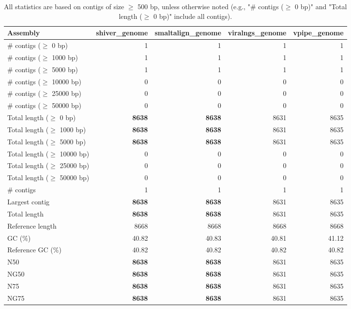 \documentclass[12pt,a4paper]{article}
\begin{document}
\begin{table}[ht]
\begin{center}
\caption{All statistics are based on contigs of size $\geq$ 500 bp, unless otherwise noted (e.g., "\# contigs ($\geq$ 0 bp)" and "Total length ($\geq$ 0 bp)" include all contigs).}
\begin{tabular}{|l*{4}{|r}|}
\hline
Assembly & shiver\_genome & smaltalign\_genome & viralngs\_genome & vpipe\_genome \\ \hline
\# contigs ($\geq$ 0 bp) & 1 & 1 & 1 & 1 \\ \hline
\# contigs ($\geq$ 1000 bp) & 1 & 1 & 1 & 1 \\ \hline
\# contigs ($\geq$ 5000 bp) & 1 & 1 & 1 & 1 \\ \hline
\# contigs ($\geq$ 10000 bp) & 0 & 0 & 0 & 0 \\ \hline
\# contigs ($\geq$ 25000 bp) & 0 & 0 & 0 & 0 \\ \hline
\# contigs ($\geq$ 50000 bp) & 0 & 0 & 0 & 0 \\ \hline
Total length ($\geq$ 0 bp) & {\bf 8638} & {\bf 8638} & 8631 & 8635 \\ \hline
Total length ($\geq$ 1000 bp) & {\bf 8638} & {\bf 8638} & 8631 & 8635 \\ \hline
Total length ($\geq$ 5000 bp) & {\bf 8638} & {\bf 8638} & 8631 & 8635 \\ \hline
Total length ($\geq$ 10000 bp) & 0 & 0 & 0 & 0 \\ \hline
Total length ($\geq$ 25000 bp) & 0 & 0 & 0 & 0 \\ \hline
Total length ($\geq$ 50000 bp) & 0 & 0 & 0 & 0 \\ \hline
\# contigs & 1 & 1 & 1 & 1 \\ \hline
Largest contig & {\bf 8638} & {\bf 8638} & 8631 & 8635 \\ \hline
Total length & {\bf 8638} & {\bf 8638} & 8631 & 8635 \\ \hline
Reference length & 8668 & 8668 & 8668 & 8668 \\ \hline
GC (\%) & 40.82 & 40.83 & 40.81 & 41.12 \\ \hline
Reference GC (\%) & 40.82 & 40.82 & 40.82 & 40.82 \\ \hline
N50 & {\bf 8638} & {\bf 8638} & 8631 & 8635 \\ \hline
NG50 & {\bf 8638} & {\bf 8638} & 8631 & 8635 \\ \hline
N75 & {\bf 8638} & {\bf 8638} & 8631 & 8635 \\ \hline
NG75 & {\bf 8638} & {\bf 8638} & 8631 & 8635 \\ \hline

\end{tabular}
\end{center}
\end{table}
\end{document}
